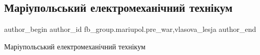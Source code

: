  
 
 
 
 

\subsection{Маріупольський електромеханічний технікум}
\label{sec:07_03_2023.fb.fb_group.mariupol.pre_war.1.mar_upolskii_yelektr}
 
\ifcmt
 author_begin
   author_id fb_group.mariupol.pre_war,vlasova_lesja
 author_end
\fi

Маріупольський електромеханічний технікум

